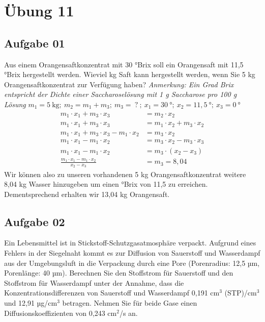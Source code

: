 \documentclass[a4paper,10pt]{article}
\begin{document}
\sidebar
{}
\par \vspace*{5mm}


\section*{Übung 11}

\subsection*{Aufgabe 01}
Aus einem Orangensaftkonzentrat mit 30 °Brix soll ein Orangensaft mit 11,5 °Brix hergestellt
werden. Wieviel kg Saft kann hergestellt werden, wenn Sie 5 kg Orangensaftkonzentrat zur
Verfügung haben?
\textit{Anmerkung: Ein Grad Brix entspricht der Dichte einer Saccharoselösung mit 1 g Saccharose
pro 100 g Lösung}
\pp
$m_1 = 5~\text{kg};~m_2 = m_1 + m_3 ;~m_3 = ~?~;~x_1=30~\text{°};~x_2=11,5~\text{°};~x_3=0~\text{°}$
\begin{align*}
m_1 \cdot x_1 + m_3 \cdot x_3 &= m_2 \cdot x_2 \\
m_1 \cdot x_1 + m_3 \cdot x_3 &= m_1 \cdot x_2 + m_3 \cdot x_2 \\
m_1 \cdot x_1 + m_3 \cdot x_3 - m_1 \cdot x_2 &= m_3 \cdot x_2 \\
m_1 \cdot x_1 - m_1 \cdot x_2 &= m_3 \cdot x_2 - m_3 \cdot x_3\\
m_1 \cdot x_1 - m_1 \cdot x_2 &= m_3 \cdot (x_2 - x_3)\\
\frac{m_1 \cdot x_1 - m_1 \cdot x_2}{x_2 - x_3} &= m_3 = 8,04
\end{align*}
Wir können also zu unseren vorhandenen 5 kg Orangensaftkonzentrat weitere 8,04 kg Wasser hinzugeben um einen °Brix von 11,5 zu erreichen. Dementsprechend erhalten wir 13,04 kg Orangensaft.
\subsection*{Aufgabe 02}
Ein Lebensmittel ist in Stickstoff-Schutzgasatmosphäre verpackt. Aufgrund eines Fehlers in
der Siegelnaht kommt es zur Diffusion von Sauerstoff und Wasserdampf aus der
Umgebungsluft in die Verpackung durch eine Pore (Porenradius: 12,5 µm, Porenlänge: 40
µm). Berechnen Sie den Stoffstrom für Sauerstoff und den Stoffstrom für Wasserdampf unter
der Annahme, dass die Konzentrationsdifferenzen von Sauerstoff und Wasserdampf 0,191 cm$^3$ (STP)/cm$^3$ und 12,91 µg/cm$^3$ betragen. Nehmen Sie für beide Gase einen Diffusionskoeffizienten von 0,243 cm$^2$/s an. 
\end{document}
